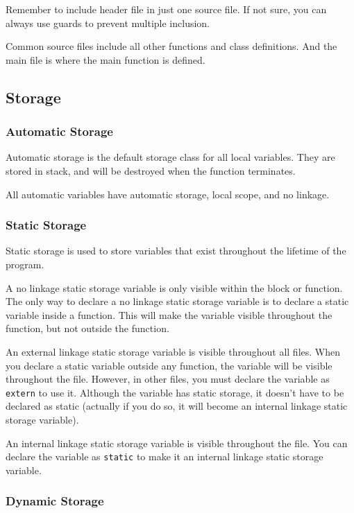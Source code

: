 \documentclass[a4paper,12pt]{article}
\begin{document}
Remember to include header file in just one source file.
If not sure, you can always use guards to prevent multiple inclusion.

Common source files include all other functions and class definitions.
And the main file is where the main function is defined.

\subsection{Storage}

\subsubsection{Automatic Storage}

Automatic storage is the default storage class for all local variables.
They are stored in stack, and will be destroyed when the function terminates.

All automatic variables have automatic storage, local scope, and no linkage.

\subsubsection{Static Storage}

Static storage is used to store variables that exist throughout the lifetime of the program.

A no linkage static storage variable is only visible within the block or function.
The only way to declare a no linkage static storage variable is to declare a static variable inside a function.
This will make the variable visible throughout the function, but not outside the function.

An external linkage static storage variable is visible throughout all files.
When you declare a static variable outside any function, the variable will be visible throughout the file.
However, in other files, you must declare the variable as \texttt{extern} to use it.
Although the variable has static storage, it doesn't have to be declared as static (actually if you do so, it will become an internal linkage static storage variable).

An internal linkage static storage variable is visible throughout the file.
You can declare the variable as \texttt{static} to make it an internal linkage static storage variable.

\subsubsection{Dynamic Storage}
\end{document}
